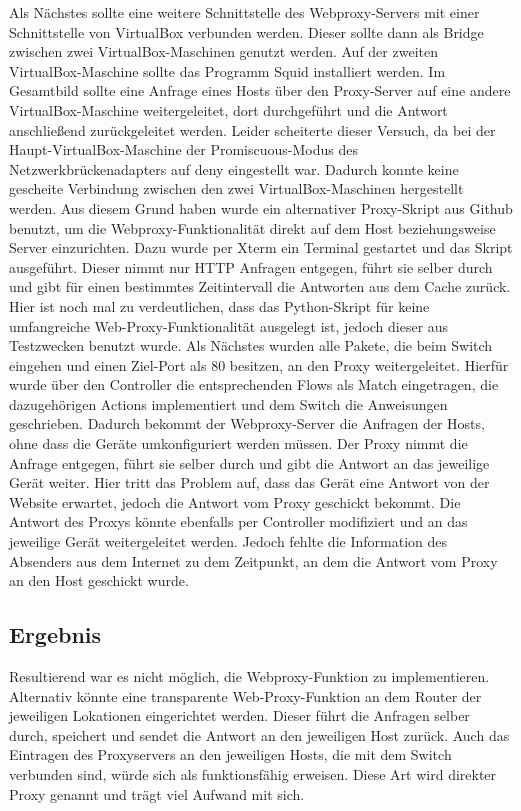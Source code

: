 \documentclass[fontsize=12pt,paper=a4,open=any,parskip=half,
  twoside=false,toc=listof,toc=bibliography,fleqn,leqno,
  captions=nooneline,captions=tableabove,british]{scrbook}
\begin{document}
Als Nächstes sollte eine weitere Schnittstelle des Webproxy-Servers mit einer Schnittstelle von VirtualBox verbunden werden. Dieser sollte dann als Bridge zwischen zwei VirtualBox-Maschinen genutzt werden. Auf der zweiten VirtualBox-Maschine sollte das Programm Squid installiert werden. Im Gesamtbild sollte eine Anfrage eines Hosts über den Proxy-Server auf eine andere VirtualBox-Maschine weitergeleitet, dort durchgeführt und die Antwort anschließend zurückgeleitet werden. Leider scheiterte dieser Versuch, da bei der Haupt-VirtualBox-Maschine der Promiscuous-Modus des Netzwerkbrückenadapters auf deny eingestellt war. Dadurch konnte keine gescheite Verbindung zwischen den zwei VirtualBox-Maschinen hergestellt werden. Aus diesem Grund haben wurde ein alternativer Proxy-Skript aus Github benutzt, um die Webproxy-Funktionalität direkt auf dem Host beziehungsweise Server einzurichten. Dazu wurde per Xterm ein Terminal gestartet und das Skript ausgeführt. Dieser nimmt nur HTTP Anfragen entgegen, führt sie selber durch und gibt für einen bestimmtes Zeitintervall die Antworten aus dem Cache zurück. Hier ist noch mal zu verdeutlichen, dass das Python-Skript für keine umfangreiche Web-Proxy-Funktionalität ausgelegt ist, jedoch dieser aus Testzwecken benutzt wurde. Als Nächstes wurden alle Pakete, die beim Switch eingehen und einen Ziel-Port als 80 besitzen, an den Proxy weitergeleitet. Hierfür wurde über den Controller die entsprechenden Flows als Match eingetragen, die dazugehörigen Actions implementiert und dem Switch die Anweisungen geschrieben. Dadurch bekommt der Webproxy-Server die Anfragen der Hosts, ohne dass die Geräte umkonfiguriert werden müssen. Der Proxy nimmt die Anfrage entgegen, führt sie selber durch und gibt die Antwort an das jeweilige Gerät weiter. Hier tritt das Problem auf, dass das Gerät eine Antwort von der Website erwartet, jedoch die Antwort vom Proxy geschickt bekommt. Die Antwort des Proxys könnte ebenfalls per Controller modifiziert und an das jeweilige Gerät weitergeleitet werden. Jedoch fehlte die Information des Absenders aus dem Internet zu dem Zeitpunkt, an dem die Antwort vom Proxy an den Host geschickt wurde.

\subsection{Ergebnis}
Resultierend war es nicht möglich, die Webproxy-Funktion zu implementieren. Alternativ könnte eine transparente Web-Proxy-Funktion an dem Router der jeweiligen Lokationen eingerichtet werden. Dieser führt die Anfragen selber durch, speichert und sendet die Antwort an den jeweiligen Host zurück. Auch das Eintragen des Proxyservers an den jeweiligen Hosts, die mit dem Switch verbunden sind, würde sich als funktionsfähig erweisen. Diese Art wird direkter Proxy genannt und trägt viel Aufwand mit sich.
\end{document}
